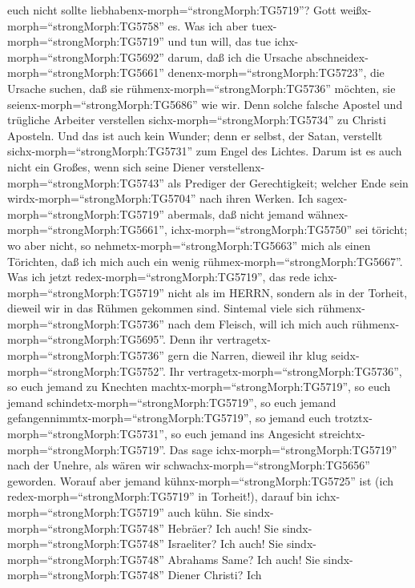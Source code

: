 euch nicht sollte liebhabenx-morph=``strongMorph:TG5719''? Gott
weißx-morph=``strongMorph:TG5758'' es.  Was ich aber
tuex-morph=``strongMorph:TG5719'' und tun will, das tue
ichx-morph=``strongMorph:TG5692'' darum, daß ich die Ursache
abschneidex-morph=``strongMorph:TG5661''
denenx-morph=``strongMorph:TG5723'', die Ursache suchen, daß sie
rühmenx-morph=``strongMorph:TG5736'' möchten, sie
seienx-morph=``strongMorph:TG5686'' wie wir.  Denn solche
falsche Apostel und trügliche Arbeiter verstellen
sichx-morph=``strongMorph:TG5734'' zu Christi Aposteln. 
Und das ist auch kein Wunder; denn er selbst, der Satan, verstellt
sichx-morph=``strongMorph:TG5731'' zum Engel des Lichtes. 
Darum ist es auch nicht ein Großes, wenn sich seine Diener
verstellenx-morph=``strongMorph:TG5743'' als Prediger der Gerechtigkeit;
welcher Ende sein wirdx-morph=``strongMorph:TG5704'' nach ihren Werken.
 Ich sagex-morph=``strongMorph:TG5719'' abermals, daß nicht
jemand wähnex-morph=``strongMorph:TG5661'',
ichx-morph=``strongMorph:TG5750'' sei töricht; wo aber nicht, so
nehmetx-morph=``strongMorph:TG5663'' mich als einen Törichten, daß ich
mich auch ein wenig rühmex-morph=``strongMorph:TG5667''. 
Was ich jetzt redex-morph=``strongMorph:TG5719'', das rede
ichx-morph=``strongMorph:TG5719'' nicht als im HERRN, sondern als in der
Torheit, dieweil wir in das Rühmen gekommen sind.  Sintemal
viele sich rühmenx-morph=``strongMorph:TG5736'' nach dem Fleisch, will
ich mich auch rühmenx-morph=``strongMorph:TG5695''.  Denn
ihr vertragetx-morph=``strongMorph:TG5736'' gern die Narren, dieweil ihr
klug seidx-morph=``strongMorph:TG5752''.  Ihr
vertragetx-morph=``strongMorph:TG5736'', so euch jemand zu Knechten
machtx-morph=``strongMorph:TG5719'', so euch jemand
schindetx-morph=``strongMorph:TG5719'', so euch jemand
gefangennimmtx-morph=``strongMorph:TG5719'', so jemand euch
trotztx-morph=``strongMorph:TG5731'', so euch jemand ins Angesicht
streichtx-morph=``strongMorph:TG5719''.  Das sage
ichx-morph=``strongMorph:TG5719'' nach der Unehre, als wären wir
schwachx-morph=``strongMorph:TG5656'' geworden. Worauf aber jemand
kühnx-morph=``strongMorph:TG5725'' ist (ich
redex-morph=``strongMorph:TG5719'' in Torheit!), darauf bin
ichx-morph=``strongMorph:TG5719'' auch kühn.  Sie
sindx-morph=``strongMorph:TG5748'' Hebräer? Ich auch! Sie
sindx-morph=``strongMorph:TG5748'' Israeliter? Ich auch! Sie
sindx-morph=``strongMorph:TG5748'' Abrahams Same? Ich auch!
 Sie sindx-morph=``strongMorph:TG5748'' Diener Christi? Ich
